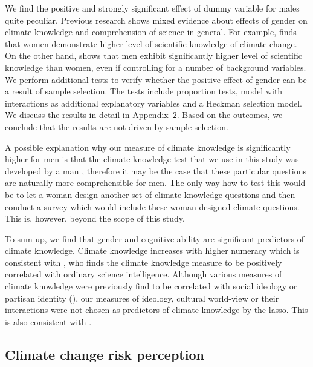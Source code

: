 \documentclass[a4paper,12pt]{article}
\begin{document}
We find the positive and strongly significant effect of dummy variable for males quite peculiar. Previous research shows mixed evidence about effects of gender on climate knowledge and comprehension of science in general. For example, \citet{McCright2010} finds that women demonstrate higher level of scientific knowledge of climate change. On the other hand, \citet{Hayes2001gender} shows that men exhibit significantly higher level of scientific knowledge than women, even if controlling for a number of background variables. We perform additional tests to verify whether the positive effect of gender can be a result of sample selection. The tests include proportion tests, model with interactions as additional explanatory variables and a Heckman selection model. We discuss the results in detail in Appendix~$2$.  Based on the outcomes, we conclude that the results are not driven by sample selection.


A possible explanation why our measure of climate knowledge is significantly higher for men is that the climate knowledge test that we use in this study was developed by a man \citep{Kahan2015}, therefore it may be the case that these particular questions are naturally more comprehensible for men. The only way how to test this would be to let a woman design another set of climate knowledge questions and then conduct a survey which would include these woman-designed climate questions. This is, however, beyond the scope of this study.


 To sum up, we find that gender and cognitive ability are significant predictors of climate knowledge.  Climate knowledge increases with higher numeracy which is consistent with \citet{Kahan2015}, who finds the climate knowledge measure to be positively correlated with ordinary science intelligence. Although various measures of climate knowledge were previously find to be correlated with social ideology or partisan identity (\citealp{Hamilton2011, Kahan2012, Kellstedt2008}), our measures of ideology, cultural world-view or their interactions were not chosen as predictors of climate knowledge by the lasso. This is also consistent with \citet{Kahan2015}.




\subsection{Climate change risk perception}\label{ResPerc}
\end{document}

